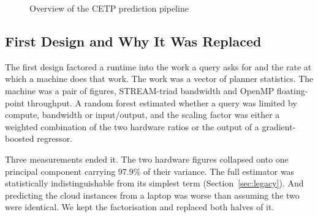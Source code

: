 \documentclass[runningheads]{llncs}
\begin{document}
\begin{figure}[t]
\centering
{}
\caption{Overview of the CETP prediction pipeline}
\label{fig:pipeline}
\end{figure}

\subsection{First Design and Why It Was Replaced}
\label{sec:first}

The first design factored a runtime into the work a query asks for and the
rate at which a machine does that work. The work was a vector of planner
statistics. The machine was a pair of figures, STREAM-triad bandwidth and
OpenMP floating-point throughput. A random forest estimated whether a query
was limited by compute, bandwidth or input/output, and the scaling factor was
either a weighted combination of the two hardware ratios or the output of a
gradient-boosted regressor.

Three measurements ended it. The two hardware figures collapsed onto one
principal component carrying 97.9\% of their variance. The full estimator was
statistically indistinguishable from its simplest term
(Section~\ref{sec:legacy}). And predicting the cloud instances from a laptop
was worse than assuming the two were identical. We kept the factorisation and
replaced both halves of it.
\end{document}
